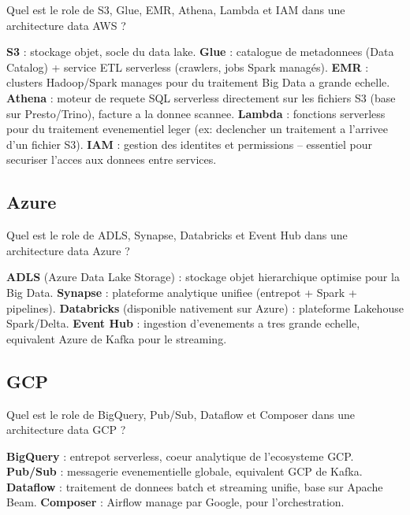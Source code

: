 \documentclass[11pt,a4paper]{article}
\begin{document}
\begin{question} Quel est le role de S3, Glue, EMR, Athena, Lambda et IAM dans une architecture data AWS ?
\end{question}
\begin{reponse}
\textbf{S3} : stockage objet, socle du data lake. \textbf{Glue} : catalogue de metadonnees (Data Catalog) + service ETL serverless (crawlers, jobs Spark managés). \textbf{EMR} : clusters Hadoop/Spark manages pour du traitement Big Data a grande echelle. \textbf{Athena} : moteur de requete SQL serverless directement sur les fichiers S3 (base sur Presto/Trino), facture a la donnee scannee. \textbf{Lambda} : fonctions serverless pour du traitement evenementiel leger (ex: declencher un traitement a l'arrivee d'un fichier S3). \textbf{IAM} : gestion des identites et permissions -- essentiel pour securiser l'acces aux donnees entre services.
\end{reponse}

\subsection{Azure}

\begin{question} Quel est le role de ADLS, Synapse, Databricks et Event Hub dans une architecture data Azure ?
\end{question}
\begin{reponse}
\textbf{ADLS} (Azure Data Lake Storage) : stockage objet hierarchique optimise pour la Big Data. \textbf{Synapse} : plateforme analytique unifiee (entrepot + Spark + pipelines). \textbf{Databricks} (disponible nativement sur Azure) : plateforme Lakehouse Spark/Delta. \textbf{Event Hub} : ingestion d'evenements a tres grande echelle, equivalent Azure de Kafka pour le streaming.
\end{reponse}

\subsection{GCP}

\begin{question} Quel est le role de BigQuery, Pub/Sub, Dataflow et Composer dans une architecture data GCP ?
\end{question}
\begin{reponse}
\textbf{BigQuery} : entrepot serverless, coeur analytique de l'ecosysteme GCP. \textbf{Pub/Sub} : messagerie evenementielle globale, equivalent GCP de Kafka. \textbf{Dataflow} : traitement de donnees batch et streaming unifie, base sur Apache Beam. \textbf{Composer} : Airflow manage par Google, pour l'orchestration.
\end{reponse}
\end{document}
